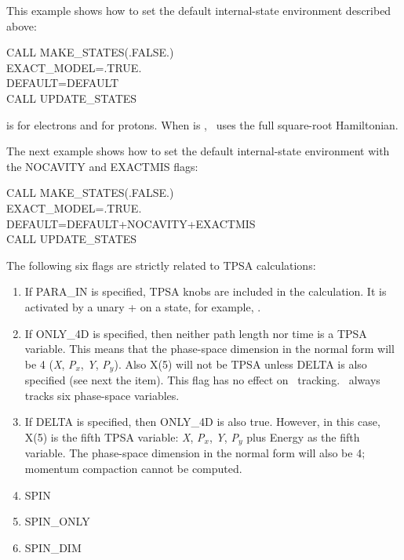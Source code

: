 This example shows how to set the default internal-state environment described
above:

\begin{ptccode}
CALL MAKE\_STATES(.FALSE.)\\
EXACT\_MODEL=.TRUE.\\
DEFAULT=DEFAULT\\
CALL UPDATE\_STATES\\
\end{ptccode}

is for electrons and for protons.
When is  , \PTC\ uses the full square-root Hamiltonian.

The next example shows how to set the default internal-state environment with the
NOCAVITY and EXACTMIS flags:

\begin{ptccode}
CALL MAKE\_STATES(.FALSE.)\\
EXACT\_MODEL=.TRUE.\\
DEFAULT=DEFAULT+NOCAVITY+EXACTMIS\\
CALL UPDATE\_STATES\\
\end{ptccode}

The following six flags are strictly related to TPSA calculations:

\begin{enumerate}
  \item If PARA\_IN is specified, TPSA knobs are included in the calculation. It
is activated by a unary + on a state, for example, .
  \item If ONLY\_4D is specified, then neither path length nor time is a TPSA variable.
This means that the phase-space dimension in the normal form will
be 4 (\emph{X}, \emph{P}$_{x}$, \emph{Y}, \emph{P}$_{y}$). Also X(5) will not be
TPSA unless DELTA is also specified (see next the item). This flag has no effect on
\PTC\ tracking. \PTC\ always tracks six phase-space variables.
  \item If DELTA is specified, then ONLY\_4D is also true. However, in this case,
X(5) is the fifth TPSA variable:  \emph{X}, \emph{P}$_{x}$, \emph{Y}, \emph{P}$_{y}$ plus
Energy as the fifth variable. The phase-space dimension in the normal
form will also be 4; momentum compaction cannot be computed.
  \item SPIN
  \item SPIN\_ONLY
  \item SPIN\_DIM
\end{enumerate}

